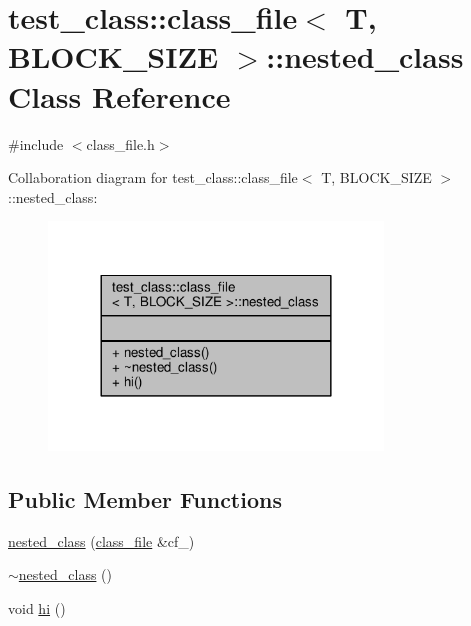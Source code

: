 \hypertarget{classtest__class_1_1class__file_1_1nested__class}{\section{test\-\_\-class\-:\-:class\-\_\-file$<$ T, B\-L\-O\-C\-K\-\_\-\-S\-I\-Z\-E $>$\-:\-:nested\-\_\-class Class Reference}
\label{classtest__class_1_1class__file_1_1nested__class}
}


{\ttfamily \#include $<$class\-\_\-file.\-h$>$}



Collaboration diagram for test\-\_\-class\-:\-:class\-\_\-file$<$ T, B\-L\-O\-C\-K\-\_\-\-S\-I\-Z\-E $>$\-:\-:nested\-\_\-class\-:
\nopagebreak
\begin{figure}[H]
\begin{center}
\leavevmode
\includegraphics[width=252pt]{classtest__class_1_1class__file_1_1nested__class__coll__graph}
\end{center}
\end{figure}
\subsection*{Public Member Functions}
\begin{DoxyCompactItemize}
\item 
\hyperlink{classtest__class_1_1class__file_1_1nested__class_a159f445c4d8c68c30958e924151dd6ec}{nested\-\_\-class} (\hyperlink{classtest__class_1_1class__file}{class\-\_\-file} \&cf\-\_\-)
\item 
\hyperlink{classtest__class_1_1class__file_1_1nested__class_a83499df13480903814f21b3bd927d6f1}{$\sim$nested\-\_\-class} ()
\item 
void \hyperlink{classtest__class_1_1class__file_1_1nested__class_a85619047a341bd02a6215ab231b03933}{hi} ()
\end{DoxyCompactItemize}


